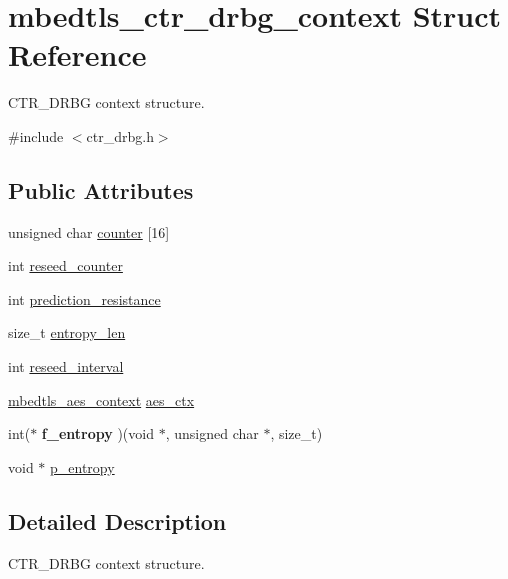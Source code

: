 \hypertarget{structmbedtls__ctr__drbg__context}{\section{mbedtls\-\_\-ctr\-\_\-drbg\-\_\-context Struct Reference}
\label{structmbedtls__ctr__drbg__context}
}


C\-T\-R\-\_\-\-D\-R\-B\-G context structure.  




{\ttfamily \#include $<$ctr\-\_\-drbg.\-h$>$}

\subsection*{Public Attributes}
\begin{DoxyCompactItemize}
\item 
unsigned char \hyperlink{structmbedtls__ctr__drbg__context_a45ccb95b2b7828711c158fc4a06d41fc}{counter} \mbox{[}16\mbox{]}
\item 
int \hyperlink{structmbedtls__ctr__drbg__context_abdbeba1194553f4f1a3534712dc0c9f9}{reseed\-\_\-counter}
\item 
int \hyperlink{structmbedtls__ctr__drbg__context_ae521e373913548f732e0cdfe3e82d2ac}{prediction\-\_\-resistance}
\item 
size\-\_\-t \hyperlink{structmbedtls__ctr__drbg__context_aa874779eab1f355824ff692b33755476}{entropy\-\_\-len}
\item 
int \hyperlink{structmbedtls__ctr__drbg__context_a7b048c97f8dc916d89a0c7cd9d7f8522}{reseed\-\_\-interval}
\item 
\hyperlink{structmbedtls__aes__context}{mbedtls\-\_\-aes\-\_\-context} \hyperlink{structmbedtls__ctr__drbg__context_ab9513701b8389770eb294cbc4267ff92}{aes\-\_\-ctx}
\item 
\hypertarget{structmbedtls__ctr__drbg__context_a08f54e341eb9626dda74dd5ea30eb0a3}{int($\ast$ {\bfseries f\-\_\-entropy} )(void $\ast$, unsigned char $\ast$, size\-\_\-t)}\label{structmbedtls__ctr__drbg__context_a08f54e341eb9626dda74dd5ea30eb0a3}

\item 
void $\ast$ \hyperlink{structmbedtls__ctr__drbg__context_a85ca46b24fc75d3d1c091835c8c2e0b4}{p\-\_\-entropy}
\end{DoxyCompactItemize}


\subsection{Detailed Description}
C\-T\-R\-\_\-\-D\-R\-B\-G context structure. 

